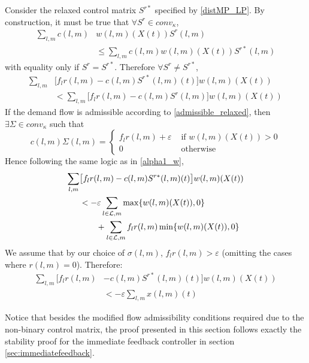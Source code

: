 \label{distributedproof}
Consider the relaxed control matrix $S^{r*}$ specified by \eqref{distMP_LP}. By construction, it must be true that $ \forall S^r \in conv_{\kappa}$, 
\begin{align} \nonumber
\sum_{l,m}c(l,m)& w(l,m)(X(t))S^r (l,m) \\
&\leq \sum_{l,m}c(l,m)w(l,m)(X(t))S^{r*}(l,m) 
\end{align}
with equality only if $S^r = S^{r*}$. 
Therefore $\forall S^r \neq S^{r*}$,
\begin{align} \nonumber
 \sum_{l,m}&\big[f_{l}r(l,m) - c(l,m)S^{r*}(l,m)(t)\big]w(l,m)(X(t)) \\
&<   \sum_{l,m}\big[f_{l}r(l,m) - c(l,m)S^r(l,m)\big]w(l,m)(X(t))
\end{align}
If the demand flow is admissible according to \eqref{admissible_relaxed}, then 
$\exists \Sigma \in conv_{\kappa}$ such that 
\begin{equation} \nonumber
c(l,m)\Sigma(l,m) = \begin{cases}
        f_{l}r(l,m) + \varepsilon & \text{ if } w(l,m)(X(t)) > 0 \\
        0 & \text{ otherwise}
    \end{cases}
\end{equation}
Hence following the same logic as in \eqref{alpha1_w}, 
\begin{align} \nonumber
 \sum_{l,m}&\big[f_{l}r(l,m) -  c(l,m)S^{r*}(l,m)(t)\big] w(l,m)(X(t))  \\ \nonumber
&  < -\varepsilon \sum_{l \in \mathcal{L},m} \max\{w(l,m)(X(t)) ,0\} \\
&\qquad +  \sum_{l \in \mathcal{L},m}  f_l r(l,m)  \min\{ w(l,m)(X(t)) ,0\}
\end{align}
We assume that by our choice of $\sigma(l,m)$, $f_{l}r(l,m) > \varepsilon$ (omitting the cases where $r(l,m) = 0$). Therefore:
\begin{align}\nonumber
\sum_{l,m}\big[ f_{l}r(l,m) & - c(l,m)S^{r*}(l,m)(t)\big]w(l,m)(X(t)) \\
&< -\varepsilon \displaystyle\sum_{l,m} x(l,m)(t)
\end{align}

Notice that besides the modified flow admissibility conditions required due to the non-binary control matrix, the proof presented in this section follows exactly the stability proof for the immediate feedback controller in section \ref{sec:immediatefeedback}. 
